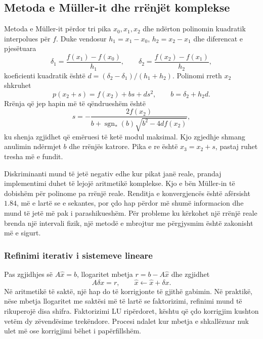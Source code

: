 \documentclass[11pt,oneside,openany]{book}
\begin{document}


\subsection{Metoda e Müller-it dhe rrënjët komplekse}
Metoda e Müller-it përdor tri pika $x_0,x_1,x_2$ dhe ndërton polinomin kuadratik interpolues për $f$. Duke vendosur $h_1=x_1-x_0$, $h_2=x_2-x_1$ dhe diferencat e pjesëtuara
\begin{equation}
 \delta_1=\frac{f(x_1)-f(x_0)}{h_1},\qquad
 \delta_2=\frac{f(x_2)-f(x_1)}{h_2},
\end{equation}
koeficienti kuadratik është $d=(\delta_2-\delta_1)/(h_1+h_2)$. Polinomi rreth $x_2$ shkruhet
\begin{equation}
 p(x_2+s)=f(x_2)+bs+ds^2,\qquad b=\delta_2+h_2d.
\end{equation}
Rrënja që jep hapin më të qëndrueshëm është
\begin{equation}
 s=-\frac{2f(x_2)}{b+\operatorname{sgn}_*(b)\sqrt{b^2-4df(x_2)}},
\end{equation}
ku shenja zgjidhet që emëruesi të ketë modul maksimal. Kjo zgjedhje shmang anulimin ndërmjet $b$ dhe rrënjës katrore. Pika e re është $x_3=x_2+s$, pastaj ruhet tresha më e fundit.

Diskriminanti mund të jetë negativ edhe kur pikat janë reale, prandaj implementimi duhet të lejojë aritmetikë komplekse. Kjo e bën Müller-in të dobishëm për polinome pa rrënjë reale. Renditja e konvergjencës është afërsisht $1.84$, më e lartë se e sekantes, por çdo hap përdor më shumë informacion dhe mund të jetë më pak i parashikueshëm. Për probleme ku kërkohet një rrënjë reale brenda një intervali fizik, një metodë e mbrojtur me përgjysmim është zakonisht më e sigurt.

\subsubsection{Refinimi iterativ i sistemeve lineare}
Pas zgjidhjes së $A\widehat x=b$, llogaritet mbetja $r=b-A\widehat x$ dhe zgjidhet
\begin{equation}
 A\delta x=r,\qquad \widehat x\leftarrow\widehat x+\delta x.
\end{equation}
Në aritmetikë të saktë, një hap do të korrigjonte të gjithë gabimin. Në praktikë, nëse mbetja llogaritet me saktësi më të lartë se faktorizimi, refinimi mund të rikuperojë disa shifra. Faktorizimi LU ripërdoret, kështu që çdo korrigjim kushton vetëm dy zëvendësime trekëndore. Procesi ndalet kur mbetja e shkallëzuar nuk ulet më ose korrigjimi bëhet i papërfillshëm.
\end{document}
